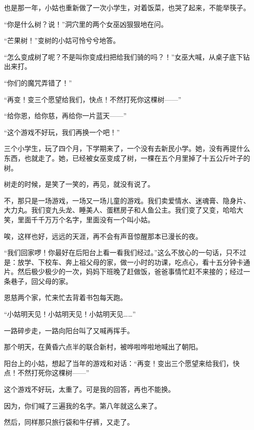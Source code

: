\par 也是那一年，小姑也重新做了一次小学生，对着饭菜，也哭了起来，不能举筷子。
\par “你是什么树？说！”洞穴里的两个女巫凶狠狠地在问。
\par “芒果树！”变树的小姑可怜兮兮地答。
\par “怎么变成树了呢？不是叫你变成扫把给我们骑的吗？！”女巫大喊，从桌子底下钻出来打。
\par “你们的魔咒弄错了！”
\par “再变！变三个愿望给我们，快点！不然打死你这棵树——”
\par “给你恩，给你慈，再给你一片蓝天——”
\par “这个游戏不好玩，我们再换一个吧！”
\par 三个小学生，玩了四个月，下学期来了，一个没有去新民小学。她，没有再提什么东西，也就走了。她，已经被女巫变成了树，一棵在五个月里掉了十五公斤叶子的树。
\par 树走的时候，是笑了一笑的，再见，就没有说了。
\par 不，那只是一场游戏，一场又一场儿童的游戏。我们卖爱情水、迷魂膏、隐身片、大力丸。我们变九头龙、睡美人、蛋糕房子和人鱼公主。我们变了又变，哈哈大笑，里面千千万万个名字，里面没有一个叫小姑。
\par 唉，这样也好，远远的天涯，再不会有声音惊醒那本已漫长的夜。
\par “我们回家啰！你最好在后阳台上看一看我们经过。”这么不放心的一句话，只不过是：放学、下校车、奔上祖父母的家，做一小时的功课，吃点心，看十五分钟卡通片。然后极少极少的一次，妈妈下班晚了赶做饭，爸爸事情忙赶不来接的；经过一条巷子，回父母的家。
\par 恩慈两个家，忙来忙去背着书包每天跑。
\par “小姑明天见！小姑明天见！小姑明天见……”
\par 一路碎步走，一路向阳台叫了又喊再挥手。
\par 那个明天，在黄昏六点半的联合新村，被哗啦哗啦地喊出了朝阳。
\par 阳台上的小姑，想起了当年的游戏和对话：“再变！变出三个愿望来给我们，快点！不然打死你这棵树——”
\par 这个游戏不好玩，太重了。可是我的回答，再也不能换。
\par 因为，你们喊了三遍我的名字。第八年就这么来了。
\par 然后，同样那只旅行袋和牛仔裤，又走了。
